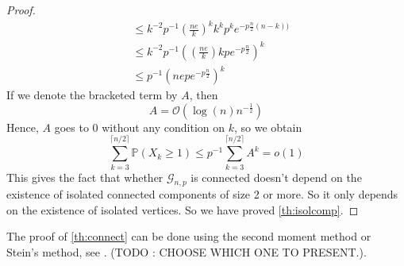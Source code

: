 \begin{proof}
\begin{align}
	            &\leq k^{-2}p^{-1}(\frac{ne}{k})^k k^{k} p^{k} e^{-p\frac{n}{2}(n-k))}\\
	            &\leq k^{-2}p^{-1}((\frac{ne}{k}) k p e^{-p\frac{n}{2}})^k\\
	            &\leq p^{-1}(nep e^{-p\frac{n}{2}})^k
\end{align}
If we denote the bracketed term by $A$, then
\begin{equation}
    A = \mathcal{O}(\log(n) n^{-\frac{1}{2}})
\end{equation}
Hence, $A$ goes to 0 without any condition on $k$, so we obtain
\begin{equation}
    \sum_{k=3}^{\lceil n/2\rceil} \mathbb{P}(X_k \geq 1)\leq p^{-1}\sum_{k=3}^{\lceil n/2\rceil} A^k = o(1)
\end{equation}
This gives the fact that whether $\mathcal{G}_{n,p}$ is connected doesn't depend on the existence of isolated connected components of size 2 or more. So it only depends on the existence of isolated vertices.
So we have proved \ref{th:isolcomp}.
\end{proof}

The proof of \ref{th:connect} can be done using the second moment method or Stein's method, see \cite{JLR}. (TODO : CHOOSE WHICH ONE TO PRESENT.).



